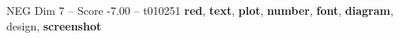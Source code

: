 \begin{textsample}{NEG Dim 7 – Score -7.00 – t010251}  \label{ex:f7_neg_017}
\textbf{red}, \textbf{text}, \textbf{plot}, \textbf{number}, \textbf{font}, \textbf{diagram}, design, \textbf{screenshot}

\end{textsample}

